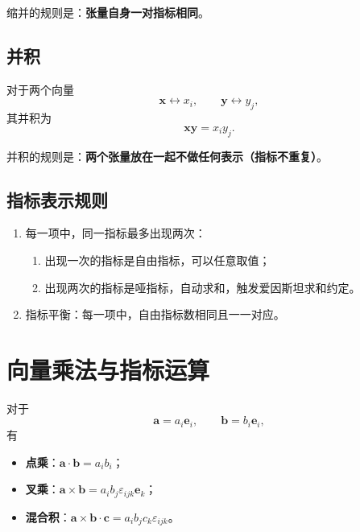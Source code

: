 缩并的规则是：\textbf{张量自身一对指标相同}。

\subsection{并积}

对于两个向量
\begin{equation}
	\boldsymbol{x}\leftrightarrow x_{i},\qquad \boldsymbol{y}\leftrightarrow y_{j},
	\label{eq:并积前}
\end{equation}
其并积为
\begin{equation}
	\boldsymbol{x}\boldsymbol{y}=x_{i}y_{j}.
	\label{eq:并积}
\end{equation}

并积的规则是：\textbf{两个张量放在一起不做任何表示（指标不重复）}。

\subsection{指标表示规则}

\begin{enumerate}
	\item 每一项中，同一指标最多出现两次：
	      \begin{enumerate}
		      \item 出现一次的指标是自由指标，可以任意取值；
		      \item 出现两次的指标是哑指标，自动求和，触发爱因斯坦求和约定。
	      \end{enumerate}
	\item 指标平衡：每一项中，自由指标数相同且一一对应。
\end{enumerate}

\section{向量乘法与指标运算}

对于
\begin{equation}
	\boldsymbol{a}=a_{i}\boldsymbol{e}_{i},\qquad \boldsymbol{b}=b_{i}\boldsymbol{e}_{i},
	\label{eq:向量的基表示}
\end{equation}
有
\begin{itemize}
	\item \textbf{点乘}：$\boldsymbol{a}\cdot\boldsymbol{b}=a_{i}b_{i}$；
	\item \textbf{叉乘}：$\boldsymbol{a}\times\boldsymbol{b}=a_{i}b_{j}\varepsilon_{ijk}\boldsymbol{e}_{k}$；
	\item \textbf{混合积}：$\boldsymbol{a}\times\boldsymbol{b}\cdot\boldsymbol{c}=a_{i}b_{j}c_{k}\varepsilon_{ijk}$。
\end{itemize}

